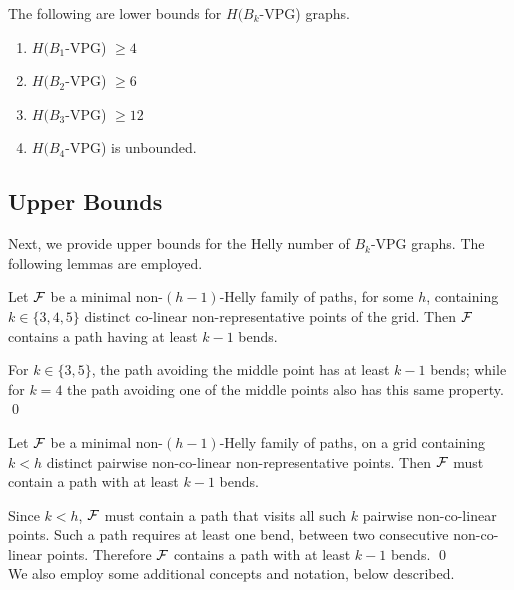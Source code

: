 \begin{lema}\label{claim:VPG-lower}
The following are lower bounds for $H(B_k$-VPG) graphs.
\begin{enumerate}
\item $H(B_1$-VPG) $\geq 4$
\item $H(B_2$-VPG) $\geq 6$
\item $H(B_3$-VPG) $\geq 12$
\item $H(B_4$-VPG) is unbounded.
\end{enumerate}
\end{lema}

\subsection{Upper Bounds}

Next, we provide upper bounds for the Helly number of $B_k$-VPG graphs. The following lemmas are employed.

\begin{lemma}\label{column-sizes}
Let $\cal F$ be a minimal non-$(h-1)$-Helly family of paths, for some $h$, containing $k \in \{3,4,5\}$ distinct co-linear non-representative points of the grid. Then $\cal F$ contains a path having at least $k-1$ bends.
\end{lemma}

\proof For $k \in \{3,5\}$, the path avoiding the middle point has at least $k-1$ bends; while for $k = 4$ the path avoiding one of the middle points also has this same property.
\qed

\begin{lemma}\label{column-number}
Let $\cal F$ be a minimal non-$(h-1)$-Helly family of paths, on a grid containing $k < h$ distinct pairwise non-co-linear non-representative points. Then $\cal F$ must contain a path with at least $k-1$ bends.
\end{lemma}   

\proof Since $k < h$, $\cal F$ must contain a path that visits all such $k$ pairwise non-co-linear points. Such a path requires at least one bend, between two consecutive non-co-linear points. Therefore $\cal F$ contains a path with at least $k-1$ bends. \qed \\

We also employ some additional concepts and notation, below described.

